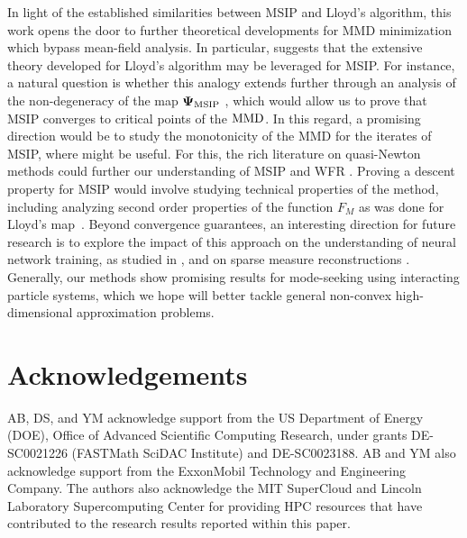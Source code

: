 



In light of the established similarities between MSIP and Lloyd's algorithm, this work opens the door to further theoretical developments for MMD minimization which bypass mean-field analysis. In particular,  suggests that the extensive theory developed for Lloyd’s algorithm may be leveraged for MSIP. For instance, a natural question is whether this analogy extends further through an analysis of the non-degeneracy of the map $\bm{\Psi}_{\mathrm{MSIP}}$ \cite{EmJuRa08}, which would allow us to prove that MSIP converges to critical points of the $\operatorname{MMD}$. In this regard, a promising direction would be to study the monotonicity of the MMD for the iterates of MSIP, where  might be useful. For this, the rich literature on quasi-Newton methods could further our understanding of MSIP and WFR \cite{NoWr99}. Proving a descent property for MSIP would involve studying technical properties of the method, including analyzing second order properties of the function $F_M$ as was done for Lloyd's map~\cite{DuFaGu99}. 
Beyond convergence guarantees, an interesting direction for future research is to explore the impact of this approach on the understanding of neural network training, as studied in \cite{ArKoSaGr19,RoJeBrVa19}, and on sparse measure reconstructions \cite{DeGa12,Chi22,BeGr24}. Generally, our methods show promising results for mode-seeking using interacting particle systems, which we hope will better tackle general non-convex high-dimensional approximation problems.

\section{Acknowledgements}
AB, DS, and YM acknowledge support from the US Department of Energy (DOE), Office of Advanced Scientific Computing Research, under grants DE-SC0021226 (FASTMath SciDAC Institute) and DE-SC0023188. AB and YM also acknowledge support from the ExxonMobil Technology and Engineering Company. The authors also acknowledge the MIT SuperCloud and Lincoln Laboratory Supercomputing Center for providing HPC resources that have contributed to the research results reported within this paper.
















